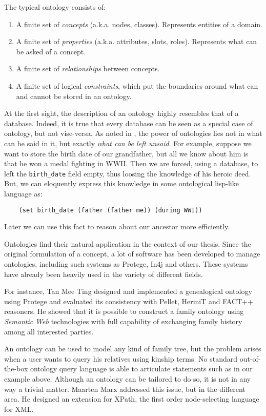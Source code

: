The typical ontology consists of:
\begin{enumerate}
    \item{A finite set of \textit{concepts} (a.k.a. nodes, classes). Represents entities of a domain.}
    \item{A finite set of \textit{properties} (a.k.a. attributes, slots, roles). Represents what can be asked of a concept.}
    \item{A finite set of \textit{relationships} between concepts.}
    \item{A finite set of logical \textit{constraints}, which put the boundaries around what can and cannot be stored in an
        ontology.}
\end{enumerate}
At the first sight, the description of an ontology highly resembles that of a database. Indeed, it is true that every database can
be seen as a special case of ontology, but not vise-versa. As noted in \cite{krhyp}, the power of ontologies lies not in what can
be said in it, but exactly \textit{what can be left unsaid}. For example, suppose we want to store the birth date of our
grandfather, but all we know about him is that he won a medal fighting in WWII.
Then we are forced, using a database, to left the \texttt{birth\_date} field empty, thus loosing the knowledge of his heroic deed.
But, we can eloquently express this knowledge in some ontological lisp-like language as:
\begin{verbatim}
    (set birth_date (father (father me)) (during WWI))
\end{verbatim}
Later we can use this fact to reason about our ancestor more efficiently.

Ontologies find their natural application in the context of our thesis.
Since the original formulation of a concept, a lot of software has been developed to manage ontologies, including such systems as
Protege, In4j and others. These systems have already been heavily used in the variety of different fields.

For instance, Tan Mee Ting \cite{tanfamily} designed and
implemented a genealogical ontology using Protege and evaluated its consistency with Pellet, HermiT and FACT++ reasoners. He
showed that it is possible to construct a family ontology using \textit{Semantic Web} \cite{web} technologies with full capability of
exchanging family history among all interested parties.

An ontology can be used to model any kind of family tree, but the problem arises when a user wants to query his relatives using
kinship terms. No standard out-of-the-box ontology query language is able to articulate statements such as in our example above.
Although an ontology can be tailored to do so, it is not in any way a trivial matter. Maarten Marx \cite{xcpath} addressed
this issue, but in the different area. He designed an extension for XPath, the first order node-selecting language for XML.

